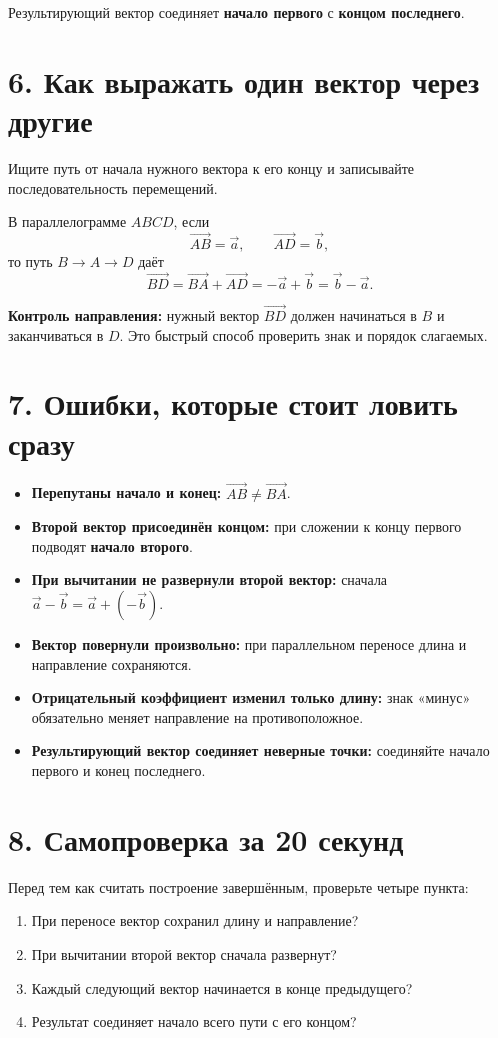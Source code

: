 \documentclass[a4paper,12pt]{article}
\newcommand{\vect}[1]{\overrightarrow{#1}}
\newcommand{\key}[1]{\textbf{\color{darkaccent}#1}}
\newcommand{\mistake}[1]{\textbf{\color{warn}#1}}
\begin{document}
Результирующий вектор соединяет \textbf{начало первого} с \textbf{концом последнего}.

\section*{6. Как выражать один вектор через другие}
Ищите путь от начала нужного вектора к его концу и записывайте последовательность перемещений.

В параллелограмме $ABCD$, если
\[
\vect{AB}=\vec a,\qquad \vect{AD}=\vec b,
\]
то путь $B\to A\to D$ даёт
\[
\vect{BD}=\vect{BA}+\vect{AD}=-\vec a+\vec b=\vec b-\vec a.
\]

\key{Контроль направления:} нужный вектор $\vect{BD}$ должен начинаться в $B$ и заканчиваться в $D$. Это быстрый способ проверить знак и порядок слагаемых.

\section*{7. Ошибки, которые стоит ловить сразу}
\begin{itemize}
  \item \mistake{Перепутаны начало и конец:} $\vect{AB}\neq\vect{BA}$.
  \item \mistake{Второй вектор присоединён концом:} при сложении к концу первого подводят \textbf{начало второго}.
  \item \mistake{При вычитании не развернули второй вектор:} сначала $\vec a-\vec b=\vec a+(-\vec b)$.
  \item \mistake{Вектор повернули произвольно:} при параллельном переносе длина и направление сохраняются.
  \item \mistake{Отрицательный коэффициент изменил только длину:} знак «минус» обязательно меняет направление на противоположное.
  \item \mistake{Результирующий вектор соединяет неверные точки:} соединяйте начало первого и конец последнего.
\end{itemize}

\section*{8. Самопроверка за 20 секунд}
Перед тем как считать построение завершённым, проверьте четыре пункта:
\begin{enumerate}[label=\arabic*.,itemsep=2pt]
  \item При переносе вектор сохранил длину и направление?
  \item При вычитании второй вектор сначала развернут?
  \item Каждый следующий вектор начинается в конце предыдущего?
  \item Результат соединяет начало всего пути с его концом?
\end{enumerate}
\end{document}

